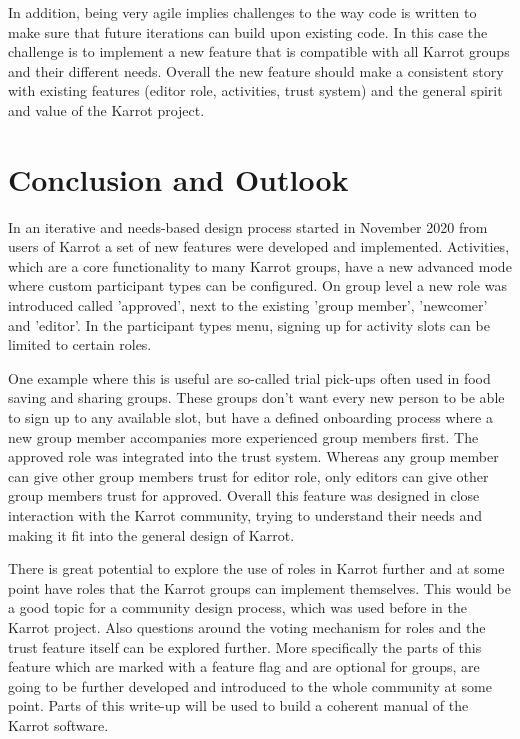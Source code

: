 \documentclass[
	a4paper,%
	11pt,%
	]{article}
\begin{document}
In addition, being very agile implies challenges to the way code is written to make sure that future iterations can build upon existing code. In this case the challenge is to implement a new feature that is compatible with all Karrot groups and their different needs. Overall the new feature should make a consistent story with existing features (editor role, activities, trust system) and the general spirit and value of the Karrot project.


\section{Conclusion and Outlook} \label{sec:outlook}

In an iterative and needs-based design process started in November 2020 from users of Karrot a set of new features were developed and implemented. Activities, which are a core functionality to many Karrot groups, have a new advanced mode where custom participant types can be configured. On group level a new role was introduced called 'approved', next to the existing 'group member', 'newcomer' and 'editor'. In the participant types menu, signing up for activity slots can be limited to certain roles.

One example where this is useful are so-called trial pick-ups often used in food saving and sharing groups. These groups don't want every new person to be able to sign up to any available slot, but have a defined onboarding process where a new group member accompanies more experienced group members first. The approved role was integrated into the trust system. Whereas any group member can give other group members trust for editor role, only editors can give other group members trust for approved. Overall this feature was designed in close interaction with the Karrot community, trying to understand their needs and making it fit into the general design of Karrot.

There is great potential to explore the use of roles in Karrot further and at some point have roles that the Karrot groups can implement themselves. This would be a good topic for a community design process, which was used before in the Karrot project. Also questions around the voting mechanism for roles and the trust feature itself can be explored further. 
More specifically the parts of this feature which are marked with a feature flag and are optional for groups, are going to be further developed and introduced to the whole community at some point. Parts of this write-up will be used to build a coherent manual of the Karrot software.
\end{document}
